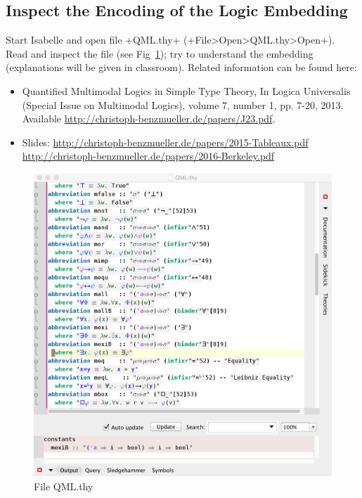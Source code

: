 \documentclass{article}
\begin{document}
\subsection{Inspect the Encoding of the Logic Embedding}
Start Isabelle and open file +QML.thy+ (+File>Open>QML.thy>Open+).
Read and inspect the file (see Fig~\ref{QML.thy}); try to understand the embedding
(explanations will be given in classroom). Related information can be
found here: 
\begin{itemize}
\item Quantified Multimodal Logics in Simple Type Theory, In Logica Universalis (Special Issue
  on Multimodal Logics), volume 7, number 1, pp. 7-20, 2013. Available
  \href{http://christoph-benzmueller.de/papers/J23.pdf}{http://christoph-benzmueller.de/papers/J23.pdf}.
\item Slides: \href{http://christoph-benzmueller.de/papers/2015-Tableaux.pdf}{http://christoph-benzmueller.de/papers/2015-Tableaux.pdf}
   \href{http://christoph-benzmueller.de/papers/2016-Berkeley.pdf}{http://christoph-benzmueller.de/papers/2016-Berkeley.pdf}
\end{itemize}

\begin{figure}[t]
\centerline{\includegraphics[width=.7\columnwidth]{./Images/QML.png}}
\caption{File QML.thy} \label{QML.thy}
\end{figure}
\end{document}
